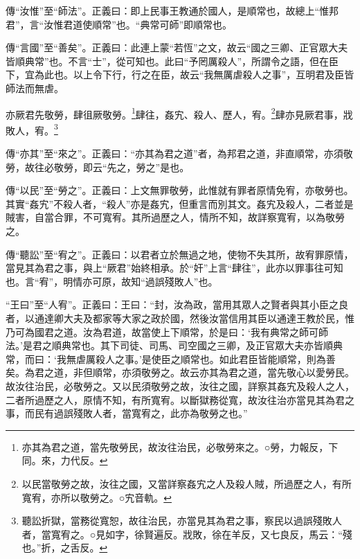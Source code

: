 {\noindent\zhuan{}\fzbyks 傳“汝惟”至“師法”。正義曰：即上民事王教通於國人，是順常也，故總上“惟邦君”，言“汝惟君道使順常”也。“典常可師”即順常也。 \par}

{\noindent\zhuan{}\fzbyks 傳“言國”至“善矣”。正義曰：此連上蒙“若恆”之文，故云“國之三卿、正官眾大夫皆順典常”也。不言“士”，從可知也。此曰“予罔厲殺人”，所謂令之語，但在臣下，宜為此也。以上令下行，行之在臣，故云“我無厲虐殺人之事”，互明君及臣皆師法而無虐。 \par}

亦厥君先敬勞，肆徂厥敬勞。\footnote{亦其為君之道，當先敬勞民，故汝往治民，必敬勞來之。○勞，力報反，下同。來，力代反。}肆往，姦宄、殺人、歷人，宥。\footnote{以民當敬勞之故，汝往之國，又當詳察姦宄之人及殺人賊，所過歷之人，有所寬宥，亦所以敬勞之。○宄音軌。}肆亦見厥君事，戕敗人，宥。\footnote{聽訟折獄，當務從寬恕，故往治民，亦當見其為君之事，察民以過誤殘敗人者，當寬宥之。○見如字，徐賢遍反。戕敗，徐在羊反，又七良反，馬云：“殘也。”折，之舌反。}

{\noindent\zhuan{}\fzbyks 傳“亦其”至“來之”。正義曰：“亦其為君之道”者，為邦君之道，非直順常，亦須敬勞，故往必敬勞，即云“先之，勞之”是也。 \par}

{\noindent\zhuan{}\fzbyks 傳“以民”至“勞之”。正義曰：上文無罪敬勞，此惟就有罪者原情免宥，亦敬勞也。其實“姦宄”不殺人者，“殺人”亦是姦宄，但重言而別其文。姦宄及殺人，二者並是賊害，自當合罪，不可寬宥。其所過歷之人，情所不知，故詳察寬宥，以為敬勞之。 \par}

{\noindent\zhuan{}\fzbyks 傳“聽訟”至“宥之”。正義曰：以君者立於無過之地，使物不失其所，故宥罪原情，當見其為君之事，與上“厥君”始終相承。於“奸”上言“肆往”，此亦以罪事往可知也。言“宥”，明情亦可原，故知“過誤殘敗人”也。 \par}

{\noindent\shu{}\fzkt “王曰”至“人宥”。正義曰：王曰：“封，汝為政，當用其眾人之賢者與其小臣之良者，以通達卿大夫及都家等大家之政於國，然後汝當信用其臣以通達王教於民，惟乃可為國君之道。汝為君道，故當使上下順常，於是曰：‘我有典常之師可師法。’是君之順典常也。其下司徒、司馬、司空國之三卿，及正官眾大夫亦皆順典常，而曰：‘我無虐厲殺人之事。’是使臣之順常也。如此君臣皆能順常，則為善矣。為君之道，非但順常，亦須敬勞之。故云亦其為君之道，當先敬心以愛勞民。故汝往治民，必敬勞之。又以民須敬勞之故，汝往之國，詳察其姦宄及殺人之人，二者所過歷之人，原情不知，有所寬宥。以斷獄務從寬，故汝往治亦當見其為君之事，而民有過誤殘敗人者，當寬宥之，此亦為敬勞之也。” \par}

